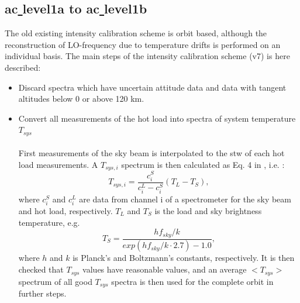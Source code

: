 \documentclass[12pt]{article}
\begin{document}
\subsection{ac\underline{ }level1a to ac\underline{ }level1b}
The old existing intensity calibration scheme is orbit based,
although the reconstruction of LO-frequency due to temperature
drifts is performed on an individual basis.
The main steps of the intensity calibration scheme (v7) is here described:  


\begin{itemize}


\item Discard spectra which have uncertain attitude data
and data with tangent altitudes below 0 or above 120 km. 

\item Convert all measurements of the hot load into
spectra of system temperature \(T_{sys}\)\\
\\
First measurements of the sky beam is interpolated
to the stw of each hot load measurements.
A \(T_{sys,i}\) spectrum is then calculated as Eq. 4 in \cite{notes}, i.e. :
\begin{equation}
T_{sys,i}=\frac{c^{S}_{i}}{c^{L}_{i}-c^{S}_{i}}(T_{L}-T_{S}),
\end{equation}  
where \(c^{S}_{i}\) and \(c^{L}_{i}\) are data from channel i of a 
spectrometer for the sky beam and hot load, respectively.
\(T_{L}\) and \(T_{S}\) is the load and sky brightness temperature, e.g.
\begin{equation}
T_{S} = \frac{hf_{sky}/k}{exp(hf_{sky}/k\cdot2.7)-1.0},
\end{equation}
where \(h\) and \(k\) is Planck's and Boltzmann's constants,
respectively.
It is then checked that \(T_{sys}\) values have reasonable
values, and an average \(<T_{sys}>\) spectrum of all
good \(T_{sys}\) spectra is then used for the complete orbit
in further steps.
 


\end{itemize}
\end{document}
